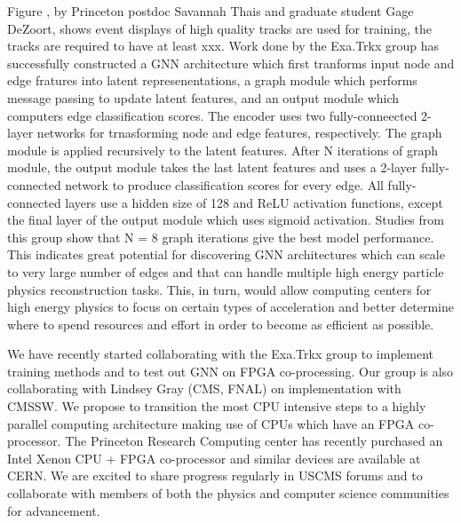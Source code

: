 \documentclass[preprint,12pt]{elsarticle}
\begin{document}
Figure %
, by Princeton postdoc Savannah Thais and graduate student Gage DeZoort, shows event displays of high quality
tracks are used for training, the tracks are required to have at least xxx.
Work done by the Exa.Trkx group %
has successfully constructed a GNN architecture which first tranforms input node and edge
fratures into latent represenentations, a graph module which performs message passing to
update latent features, and an output module which computers edge classification scores.
The encoder uses two fully-conneected 2-layer networks for trnasforming node and edge
features, respectively. The graph module is applied recursively to the latent features.
After N iterations of graph module, the output module takes the last latent features
and uses a 2-layer fully-connected network to produce classification scores for every
edge. All fully-connected layers use a hidden size of 128 and ReLU activation functions,
except the final layer of the output module which uses sigmoid activation.
Studies from this group show that N = 8 graph iterations give the best model
performance.
This indicates great potential for discovering GNN architectures which can scale 
to very large number of edges and that can handle multiple high energy particle 
physics reconstruction tasks. This, in turn, would allow computing centers for 
high energy physics to focus on certain types of acceleration and better determine 
where to spend resources and effort in order to become as efficient as possible.

We have recently started collaborating with the Exa.Trkx group to implement training methods
and to test out GNN on FPGA co-processing.
Our group is also collaborating with Lindsey Gray (CMS, FNAL) on implementation with CMSSW.
We propose to transition the most CPU intensive steps %
to a highly parallel computing architecture making use of CPUs which have an FPGA co-processor.
The Princeton Research Computing center has recently purchased an Intel Xenon CPU + FPGA co-processor
and similar devices are available at CERN. We are excited to share progress regularly 
in USCMS forums and to collaborate with members of both the physics and computer science communities
for advancement. 


\end{document}
